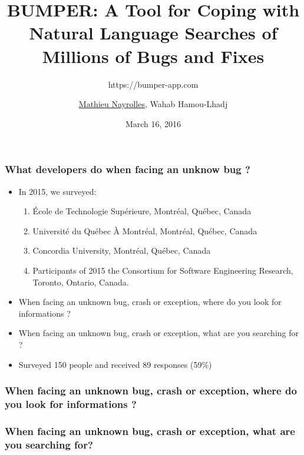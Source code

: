 \documentclass{beamer}
\title[BUMPER]{BUMPER: A Tool for Coping with Natural Language Searches of Millions of Bugs and Fixes} %
\subtitle{https://bumper-app.com}
\author[Mathieu Nayrolles]{\underline{Mathieu Nayrolles}, Wahab Hamou-Lhadj} %
\institute[Concordia] %
{
Software Behaviour Analysis (SBA) Research Lab, ECE,  Concordia, Montr\'eal, Canada
\medskip
\textit{mathieu.nayrolles@gmail.com, wahab.hamou-lhadj@concordia.ca} %
}
\date{March 16, 2016} %
\begin{document}
\begin{frame}
\titlepage %
\end{frame}


\begin{frame}
\frametitle{What developers do when facing an unknow bug ?}

\begin{itemize}
  \item In 2015, we surveyed:
  \begin{enumerate}
    \item \'Ecole de Technologie Sup\'erieure, Montr\'eal, Qu\'ebec, Canada
    \item Universit\'e du Qu\'ebec \`A Montr\'eal, Montr\'eal, Qu\'ebec, Canada
    \item Concordia University, Montr\'eal, Qu\'ebec, Canada
    \item Participants of 2015 the Consortium for Software Engineering
Research, Toronto, Ontario, Canada.
  \end{enumerate}


  \item When facing an unknown bug, crash or exception, where do you look for informations ?
  \item When facing an unknown bug, crash or exception, what are you searching for ?

\item Surveyed 150 people and received 89 responses (59\%)
\end{itemize}

\end{frame}

\begin{frame}
\frametitle{When facing an unknown bug, crash or exception, where do you look
for informations ?}





\end{frame}

\begin{frame}
\frametitle{When facing an unknown bug, crash or exception, what are you
searching for?}



\end{frame}
\end{document}
